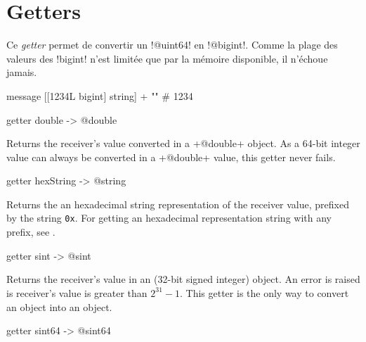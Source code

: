 \section{Getters}


Ce \emph{getter} permet de convertir un \ggs!@uint64! en \ggs!@bigint!. Comme la plage des valeurs des \ggs!bigint! n'est limitée que par la mémoire disponible, il n'échoue jamais.

\begin{galgas}
  message [[1234L bigint] string] + "\n" # 1234
\end{galgas}



\begin{galgas}
getter double -> @double
\end{galgas}

Returns the receiver's value converted in a \ggs+@double+ object. As a 64-bit integer value can always be converted in a \ggs+@double+ value, this getter never fails.





\begin{galgas}
getter hexString -> @string
\end{galgas}

Returns the an hexadecimal string representation of the receiver value, prefixed by the string \texttt{0x}. For getting an hexadecimal representation string with any prefix, see .






\begin{galgas}
getter sint -> @sint
\end{galgas}

Returns the receiver's value in an  (32-bit signed integer) object. An error is raised is receiver's value is greater than $2^{31}-1$. This getter is the only way to convert an  object into an  object.




\begin{galgas}
getter sint64 -> @sint64
\end{galgas}

